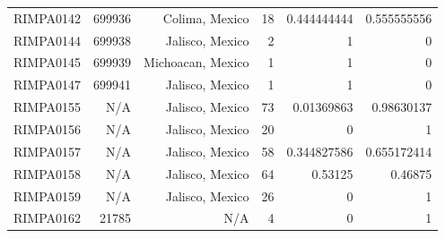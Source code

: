 \documentclass[11pt]{article}
\begin{document}
\begin{linenumbers}
\begin{flushleft}
\begin{table}[htbp]
\begin{tabular}{rrrrrr}
    RIMPA0142 & 699936 & Colima, Mexico & 18    & 0.444444444 & 0.555555556 \\
    RIMPA0144 & 699938 & Jalisco, Mexico & 2     & 1     & 0 \\
    RIMPA0145 & 699939 & Michoacan, Mexico & 1     & 1     & 0 \\
    RIMPA0147 & 699941 & Jalisco, Mexico & 1     & 1     & 0 \\
    RIMPA0155 & N/A   & Jalisco, Mexico & 73    & 0.01369863 & 0.98630137 \\
    RIMPA0156 & N/A   & Jalisco, Mexico & 20    & 0     & 1 \\
    RIMPA0157 & N/A   & Jalisco, Mexico & 58    & 0.344827586 & 0.655172414 \\
    RIMPA0158 & N/A   & Jalisco, Mexico & 64    & 0.53125 & 0.46875 \\
    RIMPA0159 & N/A   & Jalisco, Mexico & 26    & 0     & 1 \\
    RIMPA0162 & 21785 & N/A   & 4     & 0     & 1 \\
    \end{tabular}
  \label{TableS1}
\end{table}


\end{flushleft}
\end{linenumbers}
\end{document}
